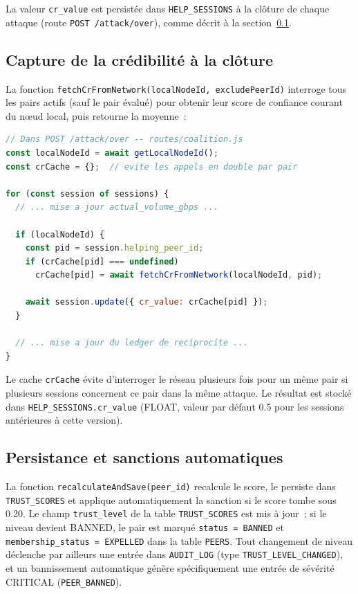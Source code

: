 La valeur \texttt{cr\_value} est persistée dans \texttt{HELP\_SESSIONS} à la clôture de chaque attaque (route \texttt{POST /attack/over}), comme décrit à la section~\ref{subsec:capture_cr}.

\subsection{Capture de la crédibilité à la clôture}
\label{subsec:capture_cr}

La fonction \texttt{fetchCrFromNetwork(localNodeId, excludePeerId)} interroge tous les pairs actifs (sauf le pair évalué) pour obtenir leur score de confiance courant du nœud local, puis retourne la moyenne~:

\begin{lstlisting}[language=JavaScript, caption={Capture de Cr et persistance à la clôture de session.}, label=lst:cr_capture]
// Dans POST /attack/over -- routes/coalition.js
const localNodeId = await getLocalNodeId();
const crCache = {};  // evite les appels en double par pair

for (const session of sessions) {
  // ... mise a jour actual_volume_gbps ...

  if (localNodeId) {
    const pid = session.helping_peer_id;
    if (crCache[pid] === undefined)
      crCache[pid] = await fetchCrFromNetwork(localNodeId, pid);

    await session.update({ cr_value: crCache[pid] });
  }

  // ... mise a jour du ledger de reciprocite ...
}
\end{lstlisting}

Le cache \texttt{crCache} évite d'interroger le réseau plusieurs fois pour un même pair si plusieurs sessions concernent ce pair dans la même attaque. Le résultat est stocké dans \texttt{HELP\_SESSIONS.cr\_value} (FLOAT, valeur par défaut 0.5 pour les sessions antérieures à cette version).

\subsection{Persistance et sanctions automatiques}

La fonction \texttt{recalculateAndSave(peer\_id)} recalcule le score, le persiste dans \texttt{TRUST\_SCORES} et applique automatiquement la sanction si le score tombe sous 0.20. Le champ \texttt{trust\_level} de la table \texttt{TRUST\_SCORES} est mis à jour~; si le niveau devient BANNED, le pair est marqué \texttt{status = BANNED} et \texttt{membership\_status = EXPELLED} dans la table \texttt{PEERS}. Tout changement de niveau déclenche par ailleurs une entrée dans \texttt{AUDIT\_LOG} (type \texttt{TRUST\_LEVEL\_CHANGED}), et un bannissement automatique génère spécifiquement une entrée de sévérité CRITICAL (\texttt{PEER\_BANNED}).

